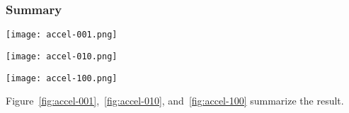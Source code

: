 \documentclass[twocolumn]{article}
\begin{document}
\subsubsection{Summary}

\begin{figure*}
   \texttt{[image: accel-001.png]}
   \label{fig:accel-001}
\end{figure*}

\begin{figure*}
   \texttt{[image: accel-010.png]}
   \label{fig:accel-010}
\end{figure*}

\begin{figure*}
   \texttt{[image: accel-100.png]}
   \label{fig:accel-100}
\end{figure*}

Figure~\ref{fig:accel-001},~\ref{fig:accel-010}, and~\ref{fig:accel-100}
summarize the result.
\end{document}
